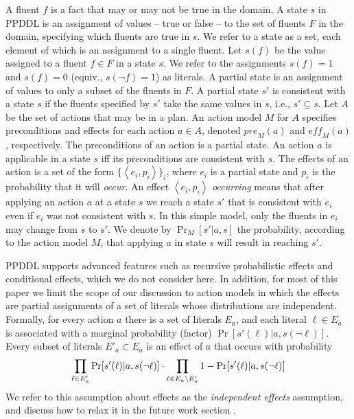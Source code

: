 \documentclass[letterpaper]{article} %
\newcommand{\eff}{\textit{eff}}
\newcommand{\pre}{\textit{pre}}
\newcommand{\tuple}[1]{\ensuremath{\left \langle #1 \right \rangle }}
\begin{document}
A fluent $f$ is a fact that may or may not be true in the domain. 
A state $s$ in PPDDL is an assignment of values -- true or false -- to the set of fluents $F$ in the domain, specifying which fluents are true in $s$. 
We refer to a state as a set, each element of which is an assignment to a single fluent.
Let $s(f)$ be the value assigned to a fluent $f\in F$ in a state $s$. We refer to the assignments $s(f)=1$ and $s(f)=0$ (equiv., $s(\neg f)=1$) as literals.
A partial state is an assignment of values to only a subset of the fluents in $F$. 
A partial state $s'$ is consistent with a state $s$ 
if the fluents specified by $s'$ take the same values in $s$, i.e., $s'\subseteq s$. 
Let $A$ be the set of actions that may be in a plan. 
An action model $M$ for $A$ specifies preconditions and effects for each action $a\in A$, 
denoted $\pre_M(a)$ and $\eff_M(a)$, respectively. 
The preconditions of an action is a partial state. 
An action $a$ is applicable in a state $s$ iff its preconditions are consistent with $s$. 
The effects of an action is a set of the form $\{ \tuple{e_i, p_i} \}_i$, 
where $e_i$ is a partial state and $p_i$ is the probability that it will \emph{occur}. 
An effect $\tuple{e_i, p_i}$ \emph{occurring} means that after applying an action $a$ at a state $s$ we reach a state $s'$ that is consistent with $e_i$ even if $e_i$ was not consistent with $s$. In this simple model, only the fluents in $e_i$ may change from $s$ to $s'$. We denote by $\Pr_M[s'|a,s]$ the probability, according to the action model $M$, 
that applying $a$ in state $s$ will result in reaching $s'$. 

PPDDL supports advanced features such as recursive probabilistic effects and conditional effects, which we do not consider here. In addition, for most of this paper we limit the scope of our discussion to action models in which the effects are partial assignments of a set of literals whose distributions are independent. 
Formally, for every action $a$ there is a set of literals $E_a$, 
and each literal $\ell\in E_a$ is associated with a marginal probability (factor) $\Pr[s'(\ell)|a,s(\neg \ell)]$. Every subset of literals $E'_a\subset E_a$ is an effect of $a$ that occurs with probability 
\begin{equation}
\small
    \prod_{\ell\in E'_a} \Pr[s'(\ell)|a,s(\neg \ell)]\cdot
    \prod_{\ell\in E_a\setminus E'_a} 1-\Pr[s'(\ell)|a,s(\neg \ell)]   
    \label{eq:assumption}
\end{equation}
We refer to this assumption about effects as the \emph{independent effects} assumption, and discuss how to relax it in the future work section . 
\end{document}
